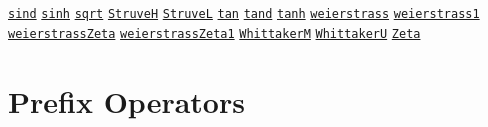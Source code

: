 \begin{list}{}
\hyperlink{operator:SIND}{\texttt{sind}}
\hyperlink{operator:SINH}{\texttt{sinh}}
\hyperlink{operator:SQRT}{\texttt{sqrt}}
\hyperlink{operator:STRUVEH}{\texttt{StruveH}}
\hyperlink{operator:STRUVEL}{\texttt{StruveL}}
\hyperlink{operator:TAN}{\texttt{tan}}
\hyperlink{operator:TAND}{\texttt{tand}}
\hyperlink{operator:TANH}{\texttt{tanh}}
\hyperlink{operator:WEIERSTRASS}{\texttt{weierstrass}}
\hyperlink{operator:WEIERSTRASS1}{\texttt{weierstrass1}}
\hyperlink{operator:WEIERSTRASSZETA}{\texttt{weierstrassZeta}}
\hyperlink{operator:WEIERSTRASSZETA1}{\texttt{weierstrassZeta1}}
\hyperlink{operator:WHITTAKERM}{\texttt{WhittakerM}}
\hyperlink{operator:WHITTAKERU}{\texttt{WhittakerU}}
\hyperlink{operator:ZETA}{\texttt{Zeta}}
\halfinterwordspace

\section{Prefix Operators}


\end{list}
